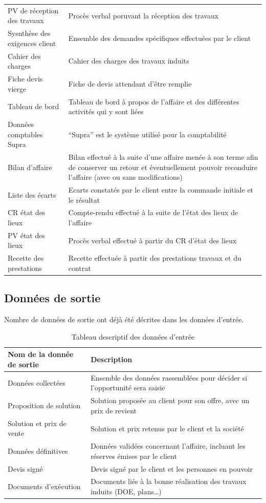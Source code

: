 \begin{table}[H]
\begin{tabular}{p{5.5cm}|p{10cm}}
        PV de réception des travaux & Procès verbal poruvant la réception des travaux \\
        Sysnthèse des exigences client & Ensemble des demandes spécifiques effectuées par le client \\
        Cahier des charges & Cahier des charges des travaux induits \\
        Fiche devis vierge & Fiche de devis attendant d’être remplie \\
        Tableau de bord & Tableau de bord à propos de l’affaire et des différentes activités qui y sont liées \\
        Données comptables Supra & “Supra” est le système utilisé pour la comptabilité \\
        Bilan d’affaire & Bilan effectué à la suite d’une affaire menée à son terme afin de conserver un retour et éventuellement pouvoir reconduire l’affaire (avec ou sans modifications) \\
        Liste des écarts & Ecarts constatés par le client entre la commande initiale et le résultat \\
        CR état des lieux & Compte-rendu effectué à la suite de l’état des lieux de l’affaire \\
        PV état des lieux & Procès verbal effectué à partir du CR d’état des lieux \\
        Recette des prestations & Recette effectuée à partir des prestations travaux et du contrat
    \end{tabular}
\end{table}

\subsection{Données de sortie}

Nombre de données de sortie ont déjà été décrites dans les données d’entrée.

\begin{table}[H]
    \centering
    \caption{Tableau descriptif des données d'entrée}
    \label{tab-donnees-entree}
    \begin{tabular}{p{5.5cm}|p{10cm}}
        \bf{Nom de la donnée de sortie} & \bf{Description} \\ \hline
        Données collectées & Ensemble des données rassemblées pour décider si l’opportunité sera saisie \\
        Proposition de solution & Solution proposée au client pour son offre, avec un prix de revient \\
    Solution et prix de vente & Solution et prix retenus par le client et la société \\
        Données définitives & Données validées concernant l’affaire, incluant les réserves émises par le client \\
        Devis signé & Devis signé par le client et les personnes en pouvoir \\
        Documents d’exécution & Documents liés à la bonne réalisation des travaux induits (DOE, plans…)

    \end{tabular}
\end{table}

